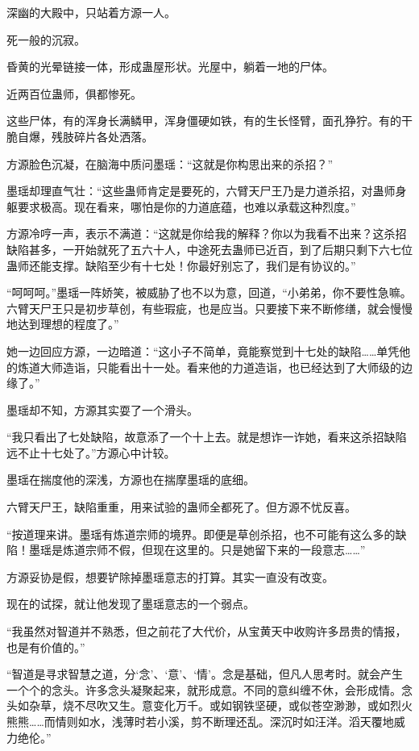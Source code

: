 
\begin{this_body}



深幽的大殿中，只站着方源一人。

死一般的沉寂。

昏黄的光晕链接一体，形成蛊屋形状。光屋中，躺着一地的尸体。

近两百位蛊师，俱都惨死。

这些尸体，有的浑身长满鳞甲，浑身僵硬如铁，有的生长怪臂，面孔狰狞。有的干脆自爆，残肢碎片各处洒落。

方源脸色沉凝，在脑海中质问墨瑶：“这就是你构思出来的杀招？”

墨瑶却理直气壮：“这些蛊师肯定是要死的，六臂天尸王乃是力道杀招，对蛊师身躯要求极高。现在看来，哪怕是你的力道底蕴，也难以承载这种烈度。”

方源冷哼一声，表示不满道：“这就是你给我的解释？你以为我看不出来？这杀招缺陷甚多，一开始就死了五六十人，中途死去蛊师已近百，到了后期只剩下六七位蛊师还能支撑。缺陷至少有十七处！你最好别忘了，我们是有协议的。”

“呵呵呵。”墨瑶一阵娇笑，被威胁了也不以为意，回道，“小弟弟，你不要性急嘛。六臂天尸王只是初步草创，有些瑕疵，也是应当。只要接下来不断修缮，就会慢慢地达到理想的程度了。”

她一边回应方源，一边暗道：“这小子不简单，竟能察觉到十七处的缺陷……单凭他的炼道大师造诣，只能看出十一处。看来他的力道造诣，也已经达到了大师级的边缘了。”

墨瑶却不知，方源其实耍了一个滑头。

“我只看出了七处缺陷，故意添了一个十上去。就是想诈一诈她，看来这杀招缺陷远不止十七处了。”方源心中计较。

墨瑶在揣度他的深浅，方源也在揣摩墨瑶的底细。

六臂天尸王，缺陷重重，用来试验的蛊师全都死了。但方源不忧反喜。

“按道理来讲。墨瑶有炼道宗师的境界。即便是草创杀招，也不可能有这么多的缺陷！墨瑶是炼道宗师不假，但现在这里的。只是她留下来的一段意志……”

方源妥协是假，想要铲除掉墨瑶意志的打算。其实一直没有改变。

现在的试探，就让他发现了墨瑶意志的一个弱点。

“我虽然对智道并不熟悉，但之前花了大代价，从宝黄天中收购许多昂贵的情报，也是有价值的。”

“智道是寻求智慧之道，分‘念’、‘意’、‘情’。念是基础，但凡人思考时。就会产生一个个的念头。许多念头凝聚起来，就形成意。不同的意纠缠不休，会形成情。念头如杂草，烧不尽吹又生。意变化万千。或如钢铁坚硬，或似苍空渺渺，或如烈火熊熊……而情则如水，浅薄时若小溪，剪不断理还乱。深沉时如汪洋。滔天覆地威力绝伦。”


\end{this_body}
